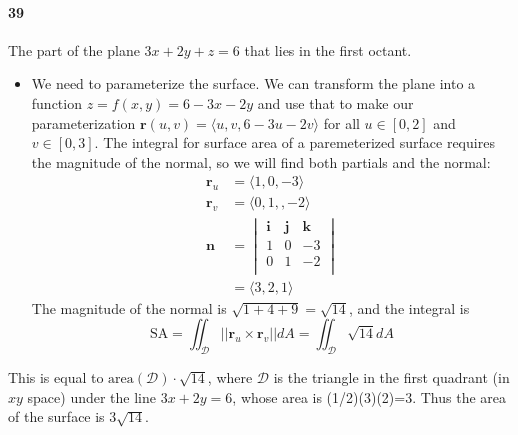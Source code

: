 \documentclass{article}
\begin{document}
    \paragraph{39} The part of the plane $3x+2y+z=6$ that lies in the first octant.
    \begin{itemize}
        \item We need to parameterize the surface. We can transform the plane into a function $z=f(x,y)=6-3x-2y$ and use that to make our parameterization $\mathbf{r}(u,v) = \langle u,v,6-3u-2v \rangle$ for all $u \in [0,2]$ and $v \in [0,3]$. The integral for surface area of a paremeterized surface requires the magnitude of the normal, so we will find both partials and the normal:
        \begin{align*}
            \mathbf{r}_u &= \langle 1, 0, -3 \rangle \\
            \mathbf{r}_v &= \langle 0, 1,, -2 \rangle \\
            \mathbf{n} &= \begin{vmatrix}
                 \mathbf{i} & \mathbf{j} & \mathbf{k}\\
                 1 & 0 & -3\\
                 0 & 1 & -2\\
            \end{vmatrix}\\
            &= \langle 3, 2, 1 \rangle
        \end{align*}
        The magnitude of the normal is $\sqrt{1+4+9} = \sqrt{14}$, and the integral is
        \[ \mathrm{SA} = \iint_{\mathcal{D}} ||\mathbf{r}_u \times \mathbf{r}_v||dA = \iint_{\mathcal{D}} \sqrt{14}dA\]
    \end{itemize}
    This is equal to $\mathrm{area}(\mathcal{D}) \cdot \sqrt{14}$, where $\mathcal{D}$ is the triangle in the first quadrant (in $xy$ space) under the line $3x+2y=6$, whose area is (1/2)(3)(2)=3. Thus the area of the surface is $3\sqrt{14}$.
    
\end{document}
